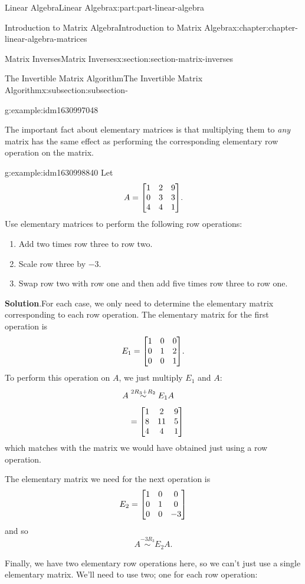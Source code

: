 \documentclass[twoside,10pt,]{book}
\newcommand{\blocktitlefont}{\relax}
\numberwithin{equation}{part}
\newcommand{\rowop}[2][]{\overset{#2}{\underset{#1}{\sim}}}
\begin{document}
\begin{partptx}{Linear Algebra}{}{Linear Algebra}{}{}{x:part:part-linear-algebra}
\begin{chapterptx}{Introduction to Matrix Algebra}{}{Introduction to Matrix Algebra}{}{}{x:chapter:chapter-linear-algebra-matrices}
\begin{sectionptx}{Matrix Inverses}{}{Matrix Inverses}{}{}{x:section:section-matrix-inverses}
\begin{subsectionptx}{The Invertible Matrix Algorithm}{}{The Invertible Matrix Algorithm}{}{}{x:subsection:subsection-}
\begin{example}{}{g:example:idm1630997048}
\end{example}
The important fact about elementary matrices is that multiplying them to \emph{any} matrix has the same effect as performing the corresponding elementary row operation on the matrix.%
\begin{example}{}{g:example:idm1630998840}%
Let%
\begin{equation*}
A = \mqty[1 & 2 & 9 \\ 0 & 3 & 3 \\ 4 & 4 & 1].
\end{equation*}
Use elementary matrices to perform the following row operations:%
\begin{enumerate}
\item{}Add two times row three to row two.%
\item{}Scale row three by \(-3\).%
\item{}Swap row two with row one and then add five times row three to row one.%
\end{enumerate}
%
\par\smallskip%
\noindent\textbf{\blocktitlefont Solution}.\hypertarget{g:solution:idm1630992696}{}\quad{}For each case, we only need to determine the elementary matrix corresponding to each row operation. The elementary matrix for the first operation is%
\begin{equation*}
E_{1} = \mqty[1 & 0 & 0 \\ 0 & 1 & 2 \\ 0 & 0 & 1].
\end{equation*}
To perform this operation on \(A\), we just multiply \(E_{1}\) and \(A\):%
\begin{align*}
A &\rowop{2R_{3}+R_{2}} E_{1}A \\
&= \mqty[1 & 2 & 9 \\ 8 & 11 & 5 \\ 4 & 4 & 1] 
\end{align*}
which matches with the matrix we would have obtained just using a row operation.%
\par
The elementary matrix we need for the next operation is%
\begin{equation*}
E_{2} = \mqty[1 & 0 & 0 \\ 0 & 1 & 0 \\ 0 & 0 & -3]
\end{equation*}
and so%
\begin{equation*}
A\rowop{-3R_{3}} E_{2}A.
\end{equation*}
%
\par
Finally, we have two elementary row operations here, so we can't just use a single elementary matrix. We'll need to use two; one for each row operation:%

\end{example}
\end{subsectionptx}
\end{sectionptx}
\end{chapterptx}
\end{partptx}
\end{document}

